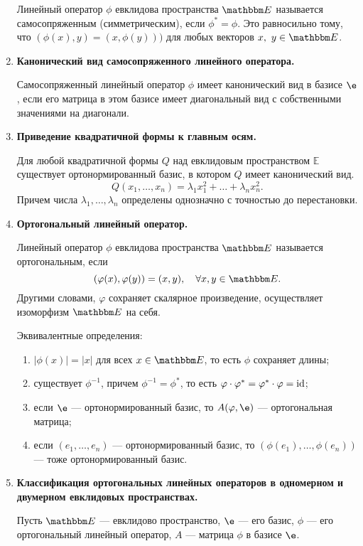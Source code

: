 \begin{enumerate}
Линейный оператор $\phi$ евклидова пространства $\E$  называется самосопряженным (симметрическим), если $\phi^* = \phi$. Это равносильно тому, что $(\phi(x), y) = (x, \phi(y)))$ для любых векторов $x,\ y \in \E$.

\item \textbf{Канонический вид самосопряженного линейного оператора.}

Самосопряженный линейный оператор $\phi$ имеет канонический вид в базисе $\e$, если его матрица в этом базисе имеет диагональный вид с собственными значениями на диагонали.

\item \textbf{Приведение квадратичной формы к главным осям.}

Для любой квадратичной формы $Q$ над  евклидовым пространством $\mathbb{E}$ существует ортонормированный базис, в котором $Q$ имеет канонический вид. 
$$
Q(x_1, \ldots, x_n) = \lambda_1 x_1^2 + \ldots + \lambda_n x_n^2.
$$
Причем числа $\lambda_1, \ldots, \lambda_n$ определены однозначно с точностью до перестановки.

\item \textbf{Ортогональный линейный оператор.}

Линейный оператор $\phi$ евклидова пространства $\E$ называется ортогональным, если
$$
(\varphi(x), \varphi(y)) = (x,y), \quad \forall x, y \in \E.
$$
Другими словами, $\varphi$ сохраняет скалярное произведение, осуществляет изоморфизм $\E$ на себя.

Эквивалентные определения:
\begin{enumerate}
\item $|\phi(x)| = |x|$ для всех $x \in \E$, то есть $\phi$ сохраняет длины;
\item существует $\phi^{-1}$, причем $\phi^{-1} = \phi^*$, то есть $\varphi \cdot \varphi^* = \varphi^*\cdot \varphi = \mathrm{id}$;
\item если $\e$ --- ортонормированный базис, то $A(\phi, \e)$ --- ортогональная матрица;
\item если $(e_1, \ldots, e_n)$ --- ортонормированный базис, то $(\phi(e_1), \ldots, \phi(e_n))$ --- тоже ортонормированный базис.
\end{enumerate}

\item \textbf{Классификация ортогональных линейных операторов в одномерном и двумерном евклидовых пространствах.}

Пусть $\E$ --- евклидово пространство, $\e$ --- его базис, $\phi$ --- его ортогональный линейный оператор, $A$ --- матрица $\phi$ в базисе $\e$.


\end{enumerate}
